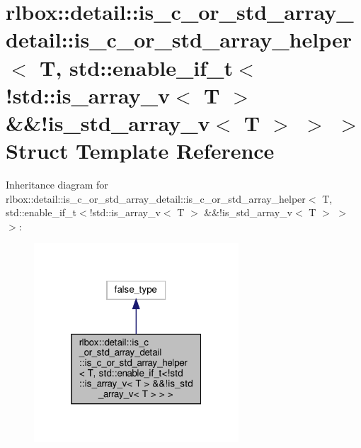 \hypertarget{structrlbox_1_1detail_1_1is__c__or__std__array__detail_1_1is__c__or__std__array__helper_3_01T_006917f5978f5075d5dadfc94abedf439f}{}\section{rlbox\+:\+:detail\+:\+:is\+\_\+c\+\_\+or\+\_\+std\+\_\+array\+\_\+detail\+:\+:is\+\_\+c\+\_\+or\+\_\+std\+\_\+array\+\_\+helper$<$ T, std\+:\+:enable\+\_\+if\+\_\+t$<$!std\+:\+:is\+\_\+array\+\_\+v$<$ T $>$ \&\&!is\+\_\+std\+\_\+array\+\_\+v$<$ T $>$ $>$ $>$ Struct Template Reference}
\label{structrlbox_1_1detail_1_1is__c__or__std__array__detail_1_1is__c__or__std__array__helper_3_01T_006917f5978f5075d5dadfc94abedf439f}


Inheritance diagram for rlbox\+:\+:detail\+:\+:is\+\_\+c\+\_\+or\+\_\+std\+\_\+array\+\_\+detail\+:\+:is\+\_\+c\+\_\+or\+\_\+std\+\_\+array\+\_\+helper$<$ T, std\+:\+:enable\+\_\+if\+\_\+t$<$!std\+:\+:is\+\_\+array\+\_\+v$<$ T $>$ \&\&!is\+\_\+std\+\_\+array\+\_\+v$<$ T $>$ $>$ $>$\+:
\nopagebreak
\begin{figure}[H]
\begin{center}
\leavevmode
\includegraphics[width=217pt]{structrlbox_1_1detail_1_1is__c__or__std__array__detail_1_1is__c__or__std__array__helper_3_01T_0015ef7885df245dfa5b578f08ccc11aa3}
\end{center}
\end{figure}


